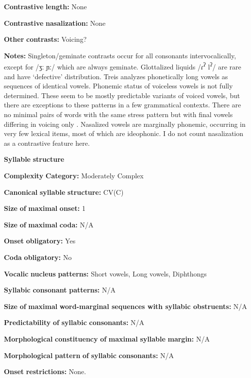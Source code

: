 \begin{styleBody}
\textbf{Contrastive} \textbf{length:} None

\textbf{Contrastive} \textbf{nasalization:} None

\textbf{Other} \textbf{contrasts:} Voicing?

\textbf{Notes:} Singleton/geminate contrasts occur for all consonants intervocalically, except for /ʒː ɲː/ which are always geminate. Glottalized liquids /ɾ\textsuperscript{ʔ} l\textsuperscript{ʔ}/ are rare and have ‘defective’ distribution. Treis analyzes phonetically long vowels as sequences of identical vowels. Phonemic status of voiceless vowels is not fully determined. These seem to be mostly predictable variants of voiced vowels, but there are exceptions to these patterns in a few grammatical contexts. There are no minimal pairs of words with the same stress pattern but with final vowels differing in voicing only \citep[20-22]{Treis2008}. Nasalized vowels are marginally phonemic, occurring in very few lexical items, most of which are ideophonic. I do not count nasalization as a contrastive feature here.

\textbf{Syllable} \textbf{structure}

\textbf{Complexity} \textbf{Category:} Moderately Complex

\textbf{Canonical} \textbf{syllable} \textbf{structure:} CV(C) \citep[41]{Treis2008}

\textbf{Size} \textbf{of} \textbf{maximal} \textbf{onset:} 1

\textbf{Size} \textbf{of} \textbf{maximal} \textbf{coda:} N/A

\textbf{Onset} \textbf{obligatory:} Yes

\textbf{Coda} \textbf{obligatory:} No

\textbf{Vocalic} \textbf{nucleus} \textbf{patterns:} Short vowels, Long vowels, Diphthongs

\textbf{Syllabic} \textbf{consonant} \textbf{patterns:} N/A

\textbf{Size} \textbf{of} \textbf{maximal} \textbf{word{}-marginal sequences with syllabic obstruents:} N/A

\textbf{Predictability} \textbf{of} \textbf{syllabic} \textbf{consonants:} N/A

\textbf{Morphological} \textbf{constituency} \textbf{of} \textbf{maximal} \textbf{syllable} \textbf{margin:} N/A

\textbf{Morphological} \textbf{pattern} \textbf{of} \textbf{syllabic} \textbf{consonants:} N/A

\textbf{Onset} \textbf{restrictions:} None.


\end{styleBody}
